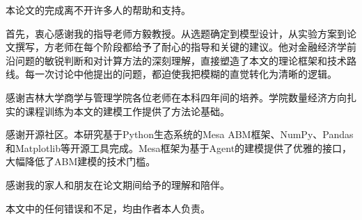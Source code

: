 ﻿\begin{acknowledgement}

本论文的完成离不开许多人的帮助和支持。

首先，衷心感谢我的指导老师方毅教授。从选题确定到模型设计，从实验方案到论文撰写，方老师在每个阶段都给予了耐心的指导和关键的建议。他对金融经济学前沿问题的敏锐判断和对计算方法的深刻理解，直接塑造了本文的理论框架和技术路线。每一次讨论中他提出的问题，都迫使我把模糊的直觉转化为清晰的逻辑。

感谢吉林大学商学与管理学院各位老师在本科四年间的培养。学院数量经济方向扎实的课程训练为本文的建模工作提供了方法论基础。

感谢开源社区。本研究基于Python生态系统的Mesa ABM框架、NumPy、Pandas和Matplotlib等开源工具完成。Mesa框架为基于Agent的建模提供了优雅的接口，大幅降低了ABM建模的技术门槛。

感谢我的家人和朋友在论文期间给予的理解和陪伴。

本文中的任何错误和不足，均由作者本人负责。

\end{acknowledgement}